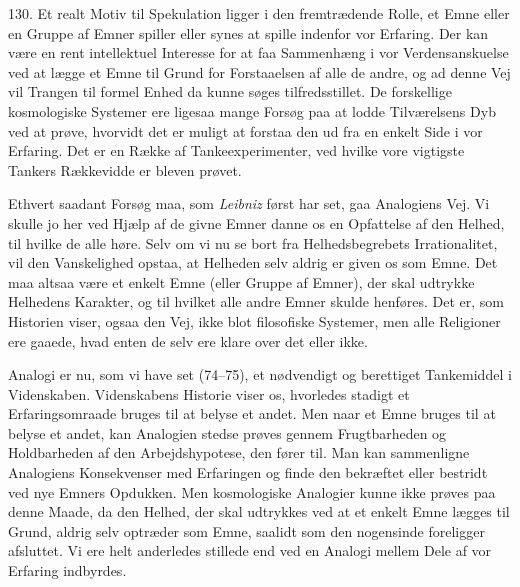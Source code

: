 \documentclass[12pt,a4paper]{book}
\newcommand{\opage}[1]{\marginnote{\footnotesize\textit{[#1]}}}
\begin{document}
130. Et realt Motiv til Spekulation ligger i den fremtrædende Rolle, et Emne eller en
Gruppe af Emner spiller eller synes at spille indenfor vor Erfaring. Der kan være en
rent intellektuel Interesse for at faa Sammenhæng i vor Verdensanskuelse ved at lægge et
Emne til Grund for Forstaaelsen af alle de andre, og ad denne Vej vil Trangen til
formel Enhed da kunne søges tilfredsstillet. De forskellige kosmologiske Systemer ere
ligesaa mange Forsøg paa at lodde Tilværelsens Dyb ved at prøve, hvorvidt det er
\opage{311} muligt at forstaa den ud fra en enkelt Side i vor Erfaring. Det er en Række af
Tankeexperimenter, ved hvilke vore vigtigste Tankers Rækkevidde er bleven prøvet.

Ethvert saadant Forsøg maa, som \emph{Leibniz} først har set, gaa Analogiens Vej. Vi
skulle jo her ved Hjælp af de givne Emner danne os en Opfattelse af den Helhed, til
hvilke de alle høre. Selv om vi nu se bort fra Helhedsbegrebets Irrationalitet, vil den
Vanskelighed opstaa, at Helheden selv aldrig er given os som Emne. Det maa altsaa være
et enkelt Emne (eller Gruppe af Emner), der skal udtrykke Helhedens Karakter, og til
hvilket alle andre Emner skulde henføres. Det er, som Historien viser, ogsaa den Vej, ikke blot filosofiske Systemer, men alle Religioner ere gaaede, hvad enten de selv ere klare over
det eller ikke.

Analogi er nu, som vi have set (74--75), et nødvendigt og berettiget Tankemiddel i
Videnskaben. Videnskabens Historie viser os, hvorledes stadigt et Erfaringsomraade
bruges til at belyse et andet. Men naar et Emne bruges til at belyse et andet, kan
Analogien stedse prøves gennem Frugtbarheden og Holdbarheden af den Arbejdshypotese,
den fører til. Man kan sammenligne Analogiens Konsekvenser med Erfaringen og finde den
bekræftet eller bestridt ved nye Emners Opdukken. Men kosmologiske Analogier kunne ikke
prøves paa denne Maade, da den Helhed, der skal udtrykkes ved at et enkelt Emne lægges
til Grund, aldrig selv optræder som Emne, saalidt som den nogensinde foreligger
afsluttet. Vi ere helt anderledes stillede end ved en Analogi mellem Dele af vor
Erfaring indbyrdes.
\end{document}
